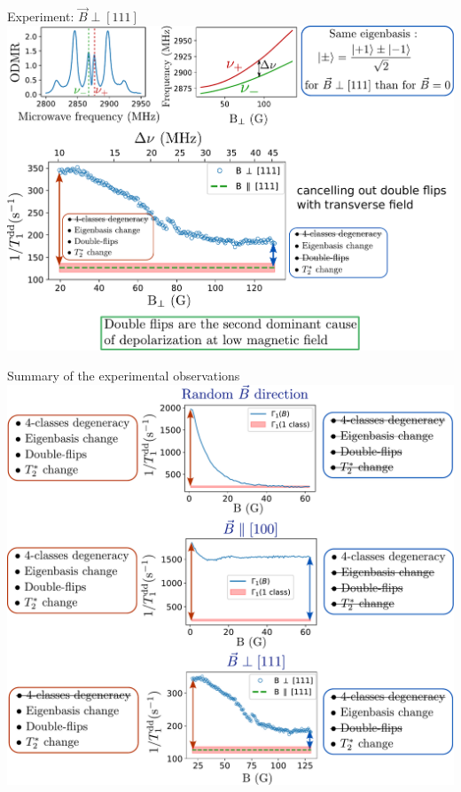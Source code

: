\documentclass{beamer}
\begin{document}
\begin{frame}{Experiment: $\vec B \perp [111]$}
\centering
\includegraphics[width=\textwidth,height=0.9\textheight,keepaspectratio]{slide_champs_transverse}
\end{frame}

\begin{frame}{Summary of the experimental observations}
\centering
\includegraphics[width=\textwidth,height=0.9\textheight,keepaspectratio]{shema_summary_exp}
\end{frame}
\end{document}
